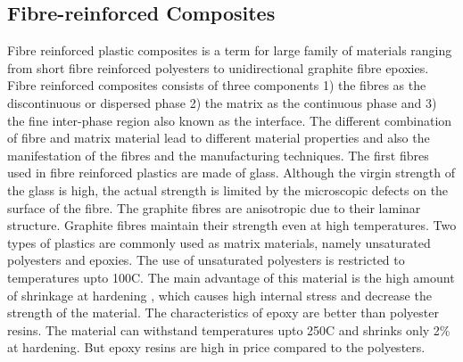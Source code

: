 \documentclass[a4paper,14pt]{extarticle}
\begin{document}
\subsection{Fibre-reinforced Composites}
\indent\indent\indent  Fibre reinforced plastic composites is a term for large family of materials ranging from short fibre reinforced polyesters to unidirectional graphite fibre epoxies. Fibre reinforced composites consists of three components 1) the fibres as the discontinuous or dispersed phase 2) the matrix as the continuous phase and 3) the fine inter-phase region also known as the interface. The different combination of fibre and matrix material lead to different material properties and also the manifestation of the fibres and the manufacturing techniques. The first fibres used in fibre reinforced plastics are made of glass. Although the virgin strength of the glass is high, the actual strength is limited by the microscopic defects on the surface of the fibre. The graphite fibres are anisotropic due to their laminar structure. Graphite fibres maintain their strength even at high temperatures. Two types of plastics are commonly used as matrix materials, namely unsaturated polyesters and epoxies. The use of unsaturated polyesters is restricted to temperatures upto 100C. The main advantage of this material is the high amount of shrinkage at hardening , which causes high internal stress and decrease the strength of the material.  The characteristics of epoxy are better than polyester resins. The material can withstand temperatures upto 250C and shrinks only  2\%  at hardening. But epoxy resins are high in price compared to the polyesters.
\end{document}
